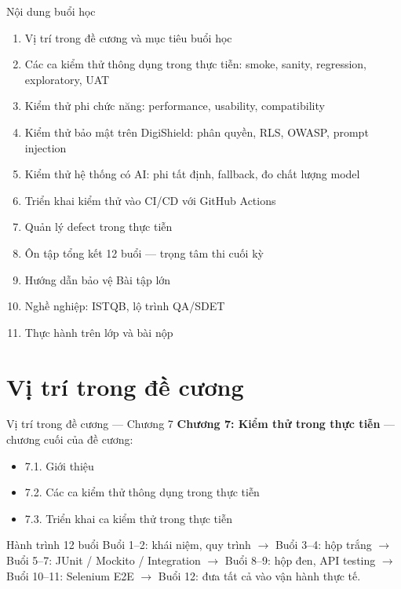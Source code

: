 \documentclass[aspectratio=169,12pt]{beamer}
\begin{document}
\begin{frame}{Nội dung buổi học}
  \begin{enumerate}
    \item Vị trí trong đề cương và mục tiêu buổi học
    \item Các ca kiểm thử thông dụng trong thực tiễn: smoke, sanity, regression, exploratory, UAT
    \item Kiểm thử phi chức năng: performance, usability, compatibility
    \item Kiểm thử bảo mật trên DigiShield: phân quyền, RLS, OWASP, prompt injection
    \item Kiểm thử hệ thống có AI: phi tất định, fallback, đo chất lượng model
    \item Triển khai kiểm thử vào CI/CD với GitHub Actions
    \item Quản lý defect trong thực tiễn
    \item Ôn tập tổng kết 12 buổi --- trọng tâm thi cuối kỳ
    \item Hướng dẫn bảo vệ Bài tập lớn
    \item Nghề nghiệp: ISTQB, lộ trình QA/SDET
    \item Thực hành trên lớp và bài nộp
  \end{enumerate}
\end{frame}

\section{Vị trí trong đề cương}

\begin{frame}{Vị trí trong đề cương --- Chương 7}
  \textbf{Chương 7: Kiểm thử trong thực tiễn} --- chương cuối của đề cương:
  \begin{itemize}
    \item 7.1. Giới thiệu
    \item 7.2. Các ca kiểm thử thông dụng trong thực tiễn
    \item 7.3. Triển khai ca kiểm thử trong thực tiễn
  \end{itemize}
  \vspace{0.4em}
  \begin{block}{Hành trình 12 buổi}
    Buổi 1--2: khái niệm, quy trình $\rightarrow$ Buổi 3--4: hộp trắng $\rightarrow$
    Buổi 5--7: JUnit / Mockito / Integration $\rightarrow$ Buổi 8--9: hộp đen, API testing
    $\rightarrow$ Buổi 10--11: Selenium E2E $\rightarrow$ \alert{Buổi 12: đưa tất cả vào vận hành thực tế}.
  \end{block}
\end{frame}
\end{document}
